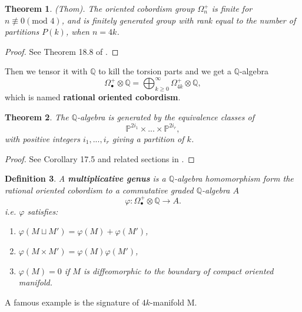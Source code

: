 \documentclass[11pt]{article}
\newtheorem{thm}{Theorem}[section]
\newtheorem{dfn}[thm]{Definition}
\newcommand{\ratl}{\mathbb Q}
\begin{document}
 \begin{thm}
 	(Thom). The oriented cobordism group $\Omega^+_n$ is finite for $n\not\equiv 0 (\text{mod } 4)$, and is finitely generated group with rank equal to the number of partitions $P(k)$, when $n=4k$.
 \end{thm}
 \begin{proof}
 See Theorem 18.8 of \cite{milnor1974characteristic}.
 \end{proof}
 Then we tensor it with $\mathbb{Q}$ to kill the torsion parts and we get a $\mathbb{Q}$-algebra
 \begin{equation*}
 	\Omega_\bullet^+\otimes \mathbb{Q}=\bigoplus_{k\geq0}^\infty \Omega^+_{4k}\otimes \mathbb{Q},
 \end{equation*}
 which is named \textbf{rational oriented cobordism}.
 \begin{thm}
 	The $\ratl$-algebra is generated by the equivalence classes of 
 	\begin{equation*}
 		\mathbb{P}^{2i_1}\times...\times\mathbb{P}^{2i_r},
 	\end{equation*}
 	with positive integers $i_1,...,i_r$ giving a partition of $k$.
 \end{thm}
 \begin{proof}
 See Corollary 17.5 and related sections in \cite{milnor1974characteristic}.
 \end{proof}
 \begin{dfn}\label{genus}
 	A \textbf{multiplicative genus} is a $\mathbb{Q}$-algebra homomorphism form the rational oriented cobordism to a commutative graded $\mathbb{Q}$-algebra $A$
 	\begin{equation*}
 		\varphi:\Omega^+_\bullet\otimes \mathbb{Q}\longrightarrow A.
 	\end{equation*}
 	i.e. $\varphi$ satisfies:
 	\begin{enumerate}[label=(\alph*)]
 	\item $\varphi(M\sqcup M')=\varphi(M)+\varphi(M')$,
 	\item $\varphi(M\times M')=\varphi(M)\varphi(M')$,
 	\item $\varphi(M)=0$ if $M$ is diffeomorphic to the boundary of compact oriented manifold.
 	\end{enumerate}
 \end{dfn}
 A famous example is the signature of $4k$-manifold M.
\end{document}
